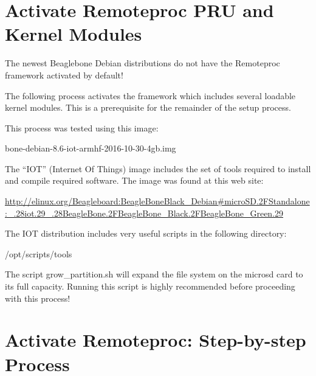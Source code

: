 \section{Activate Remoteproc PRU and Kernel Modules}

The newest Beaglebone Debian distributions do not have the Remoteproc framework activated by default!

The following process activates the framework which includes several loadable kernel modules.  This is a prerequisite for the remainder of the setup process.

This process was tested using this image:

bone-debian-8.6-iot-armhf-2016-10-30-4gb.img

The ``IOT'' (Internet Of Things) image includes the set of tools required to install and compile required software.
The image was found at this web site:

\url{http://elinux.org/Beagleboard:BeagleBoneBlack_Debian#microSD.2FStandalone:_.28iot.29_.28BeagleBone.2FBeagleBone_Black.2FBeagleBone_Green.29}

The IOT distribution includes very useful scripts in the following directory:

/opt/scripts/tools

The script grow\_partition.sh will expand the file system on the microsd card to its full capacity.  Running this script is highly recommended before proceeding with this process!

\section{Activate Remoteproc: Step-by-step Process}

